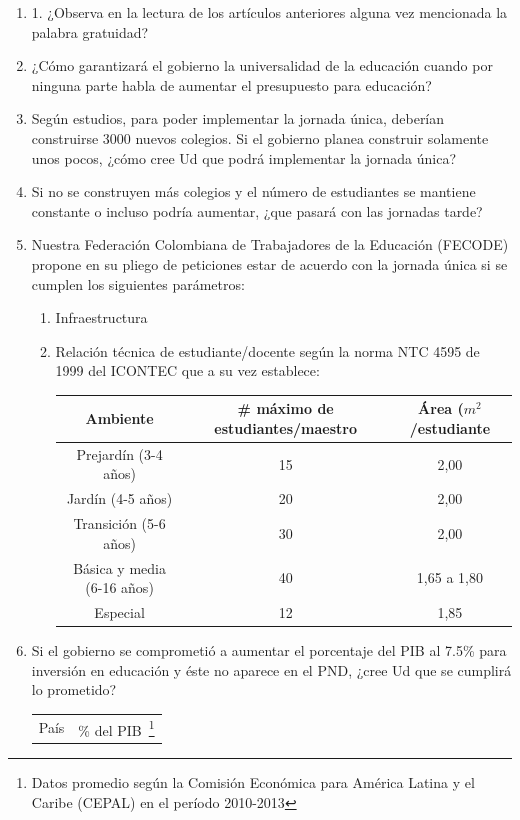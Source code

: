 \documentclass[10pt,twoside]{article}
\begin{document}
\begin{enumerate}
\item 1. ¿Observa en la lectura de los artículos anteriores alguna vez mencionada la palabra gratuidad?
\item ¿Cómo garantizará el gobierno la universalidad de la educación cuando por ninguna parte habla de aumentar el presupuesto para educación?
\item Según estudios, para poder implementar la jornada única, deberían construirse 3000 nuevos colegios. Si el gobierno planea construir solamente unos pocos, ¿cómo cree Ud que podrá implementar la jornada única?
\item Si no se construyen más colegios y el número de estudiantes se mantiene constante o incluso podría aumentar, ¿que pasará con las jornadas tarde?
\item Nuestra Federación Colombiana de Trabajadores de la Educación (FECODE) propone en su pliego de peticiones estar de acuerdo con la jornada única si se cumplen los siguientes parámetros:
\begin{enumerate}
\item Infraestructura
\item Relación técnica de estudiante/docente según la norma NTC 4595 de 1999 del ICONTEC que a su vez establece:
\begin{center}
\begin{tabular}{|c|c|c|}
\hline 
Ambiente & \# máximo de estudiantes/maestro & Área ($m^{2}$/estudiante \\ 
\hline 
Prejardín (3-4 años) & 15 & 2,00 \\ 
Jardín (4-5 años) & 20 & 2,00 \\ 
Transición (5-6 años) & 30 & 2,00 \\ 
Básica y media (6-16 años) & 40 & 1,65 a 1,80 \\ 
Especial & 12 & 1,85 \\ \hline
\end{tabular} 
\end{center}
\end{enumerate}
\item Si el gobierno se comprometió a aumentar el porcentaje del PIB al 7.5\% para inversión en educación y éste no aparece en el PND, ¿cree Ud que se cumplirá lo prometido?
\begin{center}
\begin{tabular}{|c|c|}
\hline 
País & \% del PIB~\footnote{Datos promedio según la Comisión Económica para América Latina y el Caribe (CEPAL) en el período 2010-2013} \\ 

\end{tabular}
\end{center}
\end{enumerate}
\end{document}
